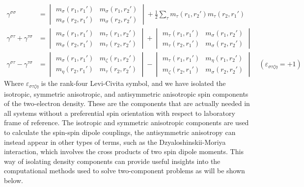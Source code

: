 \documentclass[12pt]{article}
\begin{document}
\begin{align}
 \gamma^{\sigma\sigma} &= \begin{vmatrix} m_\sigma(r_1,r_1') & m_\sigma(r_1,r_2') \\ m_\sigma(r_2,r_1') & m_\sigma(r_2,r_2') \end{vmatrix} 
  + \frac{1}{2} \sum_\tau m_\tau(r_1,r_2')m_\tau(r_2,r_1') \\
 \gamma^{\sigma\tau}+\gamma^{\tau\sigma} &= \begin{vmatrix} m_\sigma(r_1,r_1') & m_\tau(r_1,r_2')   \\ m_\sigma(r_2,r_1') & m_\tau(r_2,r_2')   \end{vmatrix} +
                                            \begin{vmatrix} m_\tau(r_1,r_1')   & m_\sigma(r_1,r_2') \\ m_\tau(r_2,r_1')   & m_\sigma(r_2,r_2') \end{vmatrix} \\
 \gamma^{\sigma\tau}-\gamma^{\tau\sigma} &= \begin{vmatrix} m_\sigma(r_1,r_1') & m_\zeta(r_1,r_2')  \\ m_\eta(r_2,r_1')   & m_\tau(r_2,r_2')   \end{vmatrix} -
                                            \begin{vmatrix} m_\tau(r_1,r_1')   & m_\eta(r_1,r_2')   \\ m_\zeta(r_2,r_1')  & m_\sigma(r_2,r_2') \end{vmatrix} \quad(\varepsilon_{\sigma\tau\zeta\eta}=+1)
\end{align}
Where $\varepsilon_{\sigma\tau\zeta\eta}$ is the rank-four Levi-Civita symbol, and we have isolated the isotropic, symmetric anisotropic, and antisymmetric anisotropic spin components of the two-electron density.
These are the components that are actually needed in all systems without a preferential spin orientation with respect to laboratory frame of reference.
The isotropic and symmetric anisotropic components are used to calculate the spin-spin dipole couplings, the antisymmetric anisotropy can instead appear in other types of terms, such as the Dzyaloshinskii-Moriya interaction,\cite{Dzyaloshinsky58_241,Moriya60_91} which involves the cross products of two spin dipole moments.
This way of isolating density components can provide useful insights into the computational methods used to solve two-component problems as will be shown below.
\end{document}
